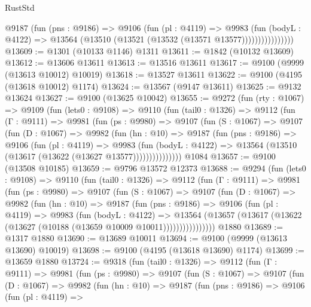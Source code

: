 \begin{lexlean}{RustStd}
\begin{coremodule}
                    @9187
                      (fun (pns : @9186) =>
                      @9106
                        (fun (pl : @4119) =>
                        @9983
                          (fun (bodyL : @4122) =>
                          @13564 (@13510 (@13521 (@13532 (@13571 @13577))))))))))))))))
@13609 := @1301 (@10133 @1146) @1311
@13611 := @1842 (@10132 @13609)
@13612 := @13606 @13611
@13613 := @13516 @13611
@13617 := @9100 (@9999 (@13613 @10012) @10019)
@13618 := @13527 @13611
@13622 := @9100 (@4195 (@13618 @10012) @1174)
@13624 := @13567 (@9147 @13611)
@13625 := @9132 @13624
@13627 := @9100 (@13625 @10042)
@13655 := @9272
    (fun (rty : @1067) =>
    @9109
      (fun (lets0 : @9108) =>
      @9110
        (fun (tail0 : @1326) =>
        @9112
          (fun (Γ : @9111) =>
          @9981
            (fun (ps : @9980) =>
            @9107
              (fun (S : @1067) =>
              @9107
                (fun (D : @1067) =>
                @9982
                  (fun (hn : @10) =>
                  @9187
                    (fun (pns : @9186) =>
                    @9106
                      (fun (pl : @4119) =>
                      @9983
                        (fun (bodyL : @4122) =>
                        @13564 (@13510 (@13617 (@13622 (@13627 @13577)))))))))))))))
    @1084
@13657 := @9100 (@13508 @10185)
@13659 := @9796 @13572 @12373
@13688 := @9294
    (fun (lets0 : @9108) =>
    @9110
      (fun (tail0 : @1326) =>
      @9112
        (fun (Γ : @9111) =>
        @9981
          (fun (ps : @9980) =>
          @9107
            (fun (S : @1067) =>
            @9107
              (fun (D : @1067) =>
              @9982
                (fun (hn : @10) =>
                @9187
                  (fun (pns : @9186) =>
                  @9106
                    (fun (pl : @4119) =>
                    @9983
                      (fun (bodyL : @4122) =>
                      @13564
                        (@13657
                          (@13617 (@13622 (@13627 (@10188 (@13659 @10009 @10011))))))))))))))))
    @1880
@13689 := @1317 @1880
@13690 := @13689 @10011
@13694 := @9100 (@9999 (@13613 @13690) @10019)
@13698 := @9100 (@4195 (@13618 @13690) @1174)
@13699 := @13659 @1880
@13724 := @9318
    (fun (tail0 : @1326) =>
    @9112
      (fun (Γ : @9111) =>
      @9981
        (fun (ps : @9980) =>
        @9107
          (fun (S : @1067) =>
          @9107
            (fun (D : @1067) =>
            @9982
              (fun (hn : @10) =>
              @9187
                (fun (pns : @9186) =>
                @9106
                  (fun (pl : @4119) =>

\end{coremodule}
\end{lexlean}
